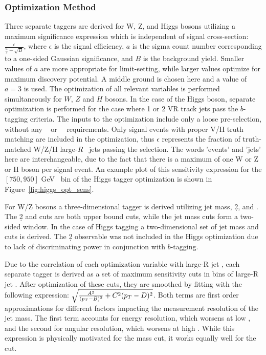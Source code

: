 \subsubsection{Optimization Method}
\label{subsec:tagger_opt}
Three separate taggers are derived for W, Z, and Higgs bosons utilizing a maximum significance expression \cite{punzi2003sensitivity} which is independent of signal cross-section: $\frac{\epsilon}{\frac{a}{2}+\sqrt{B}}$, where $\epsilon$ is the signal efficiency, $a$ is the sigma count number corresponding to a one-sided Gaussian significance, and $B$ is the background yield.
Smaller values of $a$ are more appropriate for limit-setting, while larger values optimize for maximum discovery potential.
A middle ground is chosen here and a value of $a = 3$ is used.
The optimization of all relevant variables is performed simultaneously for $W$, $Z$ and $H$ bosons.
In the case of the Higgs boson, separate optimization is performed for the case where 1 or 2 VR track jets pass the $b$-tagging criteria.
The inputs to the optimization include only a loose pre-selection, without any ~ or ~\mvh\ requirements.
Only signal events with proper V/H truth matching are included in the optimization, thus $\epsilon$ represents the fraction of truth-matched W/Z/H large-$R$ ~jets passing the selection.
The words 'events' and 'jets' here are interchangeable, due to the fact that there is a maximum of one W or Z or H boson per signal event.
An example plot of this sensitivity expression for the $[750,950]$ GeV \pt\ bin of the Higgs tagger optimization is shown in Figure~\ref{fig:higgs_opt_sens}.

For W/Z bosons a three-dimensional tagger is derived utilizing jet mass, \d2, and \ntrk.
The \d2 and \ntrk cuts are both upper bound cuts, while the jet mass cuts form a two-sided window.
In the case of Higgs tagging a two-dimensional set of jet mass and \ntrk cuts is derived.
The \d2 observable was not included in the Higgs optimization due to lack of discriminating power in conjunction with $b$-tagging.

Due to the correlation of each optimization variable with large-R jet \pt, each separate tagger is derived as a set of maximum sensitivity cuts in bins of large-R jet \pt.
After optimization of these cuts, they are smoothed by fitting with the following expression: $\sqrt{\frac{A^2}{(p_{T}-B)^2} + C^2(p_{T}-D)^2}$.
Both terms are first order approximations for different factors impacting the measurement resolution of the jet mass.
The first term accounts for energy resolution, which worsens at low \pt, and the second for angular resolution, which worsens at high \pt.
While this expression is physically motivated for the mass cut, it works equally well for the \ntrk cut.

